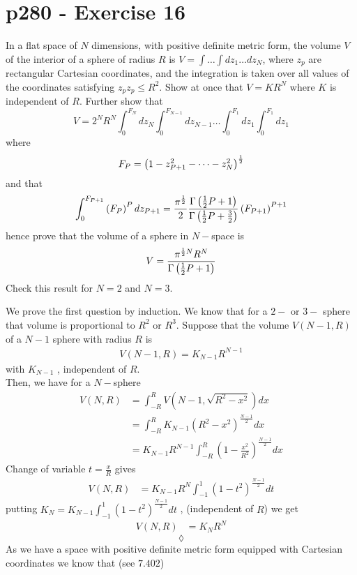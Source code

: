 \section{p280 - Exercise 16}
\begin{tcolorbox}
In a flat space of $N$ dimensions, with positive definite metric form, the volume $V$ of the interior of a sphere of radius $R$ is $V=\int \dots \int dz_1 \dots dz_N$, where $z_p$ are rectangular Cartesian coordinates, and the integration is taken over all values of the coordinates satisfying $z_pz_p \leq R^2$. Show at once that $V= KR^N$ where $K$ is independent of $R$. Further show that
$$V=2^N R^N\int_0^{F_N} dz_N\int_0^{F_{N-1}} dz_{N-1} \dots \int_0^{F_1} dz_1\int_0^{F_1} dz_1$$
where 
$$F_P=\left(1-z_{P+1}^2-\dots - z_N^2\right)^{\frac{1}{2}}$$
and that
$$\int_0^{F_{P+1}} \left(F_P\right)^P dz_{P+1}=\frac{\pi^{\frac{1}{2}}}{2}\frac{\Gamma\left(\frac{1}{2} P+1\right)}{\Gamma\left(\frac{1}{2} P+\frac{3}{2}\right)}\left(F_{P+1}\right)^{P+1}$$ hence prove that the volume of a sphere in $N-$space is 
$$V=\frac{\pi^{\frac{1}{2} N} R^N}{\Gamma\left(\frac{1}{2} P+1\right)}$$
Check this result for $N=2$ and $N=3$.
\end{tcolorbox}
We prove the first question by induction.
We know that for a $2-$ or $3-$ sphere that volume is proportional to $R^2$ or $R^3$.
Suppose that the volume $V(N-1, R)$ of a $N-1$ sphere with radius $R$ is 
\begin{align}
V(N-1, R) =  K_{N-1}R^{N-1}
\end{align}
with $K_{N-1}$ , independent of $R$.\\
Then, we have for a $N-$sphere
\begin{align}
V(N, R) &=  \int_{-R}^{R} V\left(N-1, \sqrt{R^2-x^2}\right)dx\\
&=  \int_{-R}^{R} K_{N-1}\left(R^2-x^2\right)^\frac{N-1}{2}dx\\
&=  K_{N-1}R^{N-1}\int_{-R}^{R} \left(1-\frac{x^2}{R^2}\right)^\frac{N-1}{2}dx
\end{align}
Change of variable $t=\frac{x}{R}$ gives  
\begin{align}
V(N, R) &=K_{N-1}R^{N}\int_{-1}^{1} \left(1-t^2\right)^\frac{N-1}{2}dt
\end{align}
putting $K_{N}=K_{N-1}\int_{-1}^{1} \left(1-t^2\right)^\frac{N-1}{2}dt$ , (independent of $R$) we get 
\begin{align}
V(N, R) &=K_{N}R^{N}
\end{align}
$$\lozenge$$
As we have a space with positive definite metric form equipped with Cartesian coordinates we know that (see $\mathbf{7.402}$)
